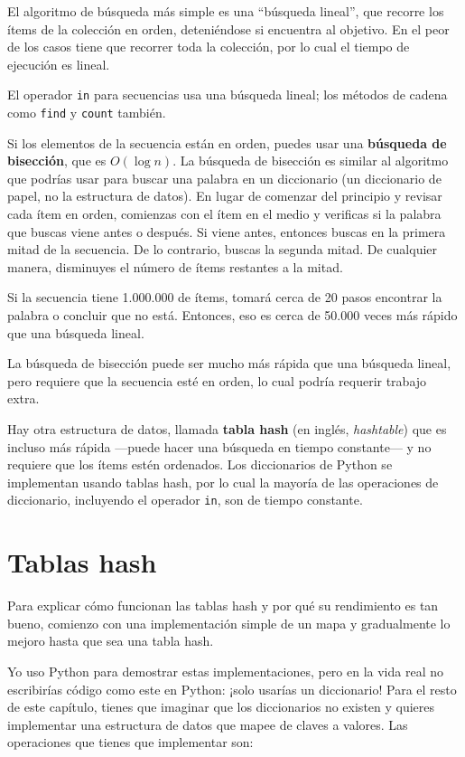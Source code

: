 \documentclass[10pt]{book}
\begin{document}
El algoritmo de búsqueda más simple es una ``búsqueda lineal'', que recorre
los ítems de la colección en orden, deteniéndose si encuentra al objetivo.
En el peor de los casos tiene que recorrer toda la colección, por lo cual el tiempo
de ejecución es lineal.

El operador {\tt in} para secuencias usa una búsqueda lineal; los métodos
de cadena como {\tt find} y {\tt count} también.

Si los elementos de la secuencia están en orden, puedes usar una {\bf
  búsqueda de bisección}, que es $O(\log n)$.  La búsqueda de bisección es
similar al algoritmo que podrías usar para buscar una palabra en un
diccionario (un diccionario de papel, no la estructura de datos).  En lugar de
comenzar del principio y revisar cada ítem en orden, comienzas
con el ítem en el medio y verificas si la palabra que buscas
viene antes o después.  Si viene antes, entonces buscas en la
primera mitad de la secuencia.  De lo contrario, buscas la segunda mitad.
De cualquier manera, disminuyes el número de ítems restantes a la mitad.

Si la secuencia tiene 1.000.000 de ítems, tomará cerca de 20 pasos
encontrar la palabra o concluir que no está.  Entonces, eso es cerca de 50.000
veces más rápido que una búsqueda lineal.

La búsqueda de bisección puede ser mucho más rápida que una búsqueda lineal, pero
requiere que la secuencia esté en orden, lo cual podría requerir
trabajo extra.

Hay otra estructura de datos, llamada {\bf tabla hash} (en inglés, {\em hashtable}) que
es incluso más rápida ---puede hacer una búsqueda en tiempo constante--- y
no requiere que los ítems estén ordenados.  Los diccionarios de Python
se implementan usando tablas hash, por lo cual la mayoría de las operaciones
de diccionario, incluyendo el operador {\tt in}, son de tiempo constante.


\section{Tablas hash}
\label{hashtable}

Para explicar cómo funcionan las tablas hash y por qué su rendimiento es tan
bueno, comienzo con una implementación simple de un mapa y
gradualmente lo mejoro hasta que sea una tabla hash.

Yo uso Python para demostrar estas implementaciones, pero en la vida
real no escribirías código como este en Python: ¡solo usarías un
diccionario!  Para el resto de este capítulo, tienes que imaginar que
los diccionarios no existen y quieres implementar una estructura de datos
que mapee de claves a valores.  Las operaciones que tienes que
implementar son:
\end{document}
